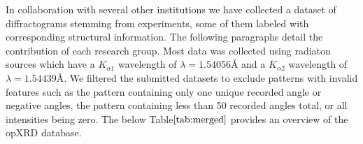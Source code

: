 In collaboration with several other institutions we have collected a dataset of diffractograms stemming from experiments, some of them labeled with corresponding structural information. The following paragraphs detail the contribution of each research group. Most data was collected using  radiaton sources which have a  $K_{\alpha1}$ wavelength of $\lambda=1.54056\text{\AA}$ and a $K_{\alpha2}$ wavelength of $\lambda=1.54439\text{\AA}$. We filtered the submitted datasets to exclude patterns with invalid features such as the pattern containing only one unique recorded angle or negative angles, the pattern containing less than 50 recorded angles total, or all intensities being zero. The below Table$\eqref{tab:merged}$ provides an overview of the opXRD database. 

\begin{table}[!htb]
\centering
\caption{\footnotesize The opXRD database: The availability of the chemical composition, spacegroups, lattice parameters, and atomic coordinates of the underlying samples are indicated by the columns ``Comp.'', ``Spg.'', ``Lattice'' and ``Atom coords.'' respectively.}
\label{tab:merged}
\end{table}

